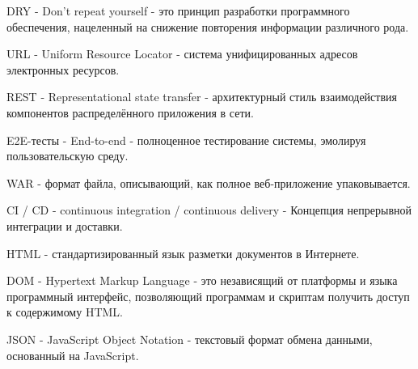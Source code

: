 DRY - Don't repeat yourself - это принцип разработки программного обеспечения, нацеленный на снижение повторения информации различного рода.

URL - Uniform Resource Locator - система унифицированных адресов электронных ресурсов.

REST - Representational state transfer -  архитектурный стиль взаимодействия компонентов распределённого приложения в сети.

E2E-тесты - End-to-end - полноценное тестирование системы, эмолируя пользовательскую среду.

WAR - формат файла, описывающий, как полное веб-приложение упаковывается.

CI / CD - continuous integration / continuous delivery - Концепция непрерывной интеграции и доставки.

HTML - стандартизированный язык разметки документов в Интернете.

DOM - Hypertext Markup Language - это независящий от платформы и языка программный интерфейс, позволяющий программам и скриптам получить доступ к содержимому HTML.

JSON - JavaScript Object Notation - текстовый формат обмена данными, основанный на JavaScript.
\thispagestyle{empty}
